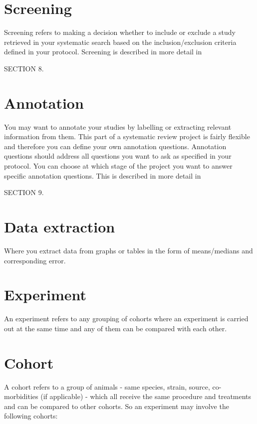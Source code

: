 \documentclass[
]{book}
\begin{document}
\hypertarget{screening}{%
\section{Screening}\label{screening}}

Screening refers to making a decision whether to include or exclude a study retrieved in your systematic search based on the inclusion/exclusion criteria defined in your protocol. Screening is described in more detail in

SECTION 8.

\hypertarget{annotation}{%
\section{Annotation}\label{annotation}}

You may want to annotate your studies by labelling or extracting relevant information from them. This part of a systematic review project is fairly flexible and therefore you can define your own annotation questions. Annotation questions should address all questions you want to ask as specified in your protocol. You can choose at which stage of the project you want to answer specific annotation questions. This is described in more detail in

SECTION 9.

\hypertarget{data-extraction}{%
\section{Data extraction}\label{data-extraction}}

Where you extract data from graphs or tables in the form of means/medians and corresponding error.

\hypertarget{experiment}{%
\section{Experiment}\label{experiment}}

An experiment refers to any grouping of cohorts where an experiment is carried out at the same time and any of them can be compared with each other.

\hypertarget{cohort}{%
\section{Cohort}\label{cohort}}

A cohort refers to a group of animals - same species, strain, source, co-morbidities (if applicable) - which all receive the same procedure and treatments and can be compared to other cohorts. So an experiment may involve the following cohorts:
\end{document}

